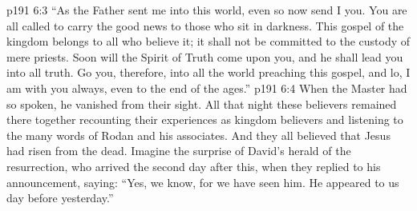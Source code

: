 \vs p191 6:3 \textcolor{ubdarkred}{“As the Father sent me into this world, even so now send I you. You are all called to carry the good news to those who sit in darkness. This gospel of the kingdom belongs to all who believe it; it shall not be committed to the custody of mere priests. Soon will the Spirit of Truth come upon you, and he shall lead you into all truth. Go you, therefore, into all the world preaching this gospel, and lo, I am with you always, even to the end of the ages.”}
\vs p191 6:4 When the Master had so spoken, he vanished from their sight. All that night these believers remained there together recounting their experiences as kingdom believers and listening to the many words of Rodan and his associates. And they all believed that Jesus had risen from the dead. Imagine the surprise of David’s herald of the resurrection, who arrived the second day after this, when they replied to his announcement, saying: “Yes, we know, for we have seen him. He appeared to us day before yesterday.”
